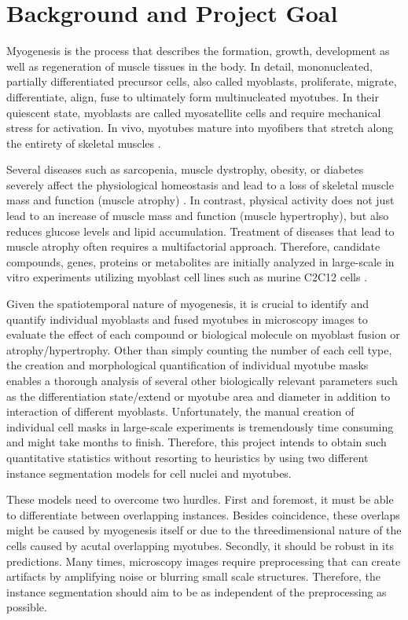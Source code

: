 \section{Background and Project Goal}
Myogenesis is the process that describes the formation, growth, development as well as regeneration of muscle tissues in the body. In detail, mononucleated, partially differentiated precursor cells, also called myoblasts, proliferate, migrate, differentiate, align, fuse to ultimately form multinucleated myotubes. In their quiescent state, myoblasts are called myosatellite cells and require mechanical stress for activation. In vivo, myotubes mature into myofibers that stretch along the entirety of skeletal muscles \cite{tajbakhsh2009, bentzinger, bollen}.

Several diseases such as sarcopenia, muscle dystrophy, obesity, or diabetes severely affect the physiological homeostasis and lead to a loss of skeletal muscle mass and function (muscle atrophy) \cite{argiles}. In contrast, physical activity does not just lead to an increase of muscle mass and function (muscle hypertrophy), but also reduces glucose levels and lipid accumulation. Treatment of diseases that lead to muscle atrophy often requires a multifactorial approach. Therefore, candidate compounds, genes, proteins or metabolites are initially analyzed in large-scale in vitro experiments utilizing myoblast cell lines such as murine C2C12 cells \cite{bajaj}.

Given the spatiotemporal nature of myogenesis, it is crucial to identify and quantify individual myoblasts and fused myotubes in microscopy images to evaluate the effect of each compound or biological molecule on myoblast fusion or atrophy/hypertrophy. Other than simply counting the number of each cell type, the creation and morphological quantification of individual myotube masks enables a thorough analysis of several other biologically relevant parameters such as the differentiation state/extend or myotube area and diameter in addition to interaction of different myoblasts. Unfortunately, the manual creation of individual cell masks in large-scale experiments is tremendously time consuming and might take months to finish. Therefore, this project intends to obtain such quantitative statistics without resorting to heuristics by using two different instance segmentation models for cell nuclei and myotubes.

These models need to overcome two hurdles. First and foremost, it must be able to differentiate between overlapping instances. Besides coincidence, these overlaps might be caused by myogenesis itself or due to the threedimensional nature of the cells caused by acutal overlapping myotubes. Secondly, it should be robust in its predictions. Many times, microscopy images require preprocessing that can create artifacts by amplifying noise or blurring small scale structures. Therefore, the instance segmentation should aim to be as independent of the preprocessing as possible.


